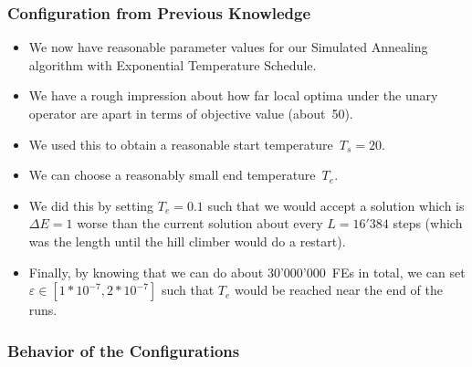 \documentclass[mathserif]{beamer}%
\begin{document}
%
\setcounter{eqLast}{\value{equation}}%
%
\begin{frame}%
\frametitle{Configuration from Previous Knowledge}%
\begin{itemize}%
\item We now have reasonable parameter values for our Simulated Annealing algorithm with Exponential Temperature Schedule.%
\item<2-> We have a rough impression about how far local optima under the unary operator are apart in terms of objective value (about~50).%
\item<3-> We used this to obtain a reasonable start \mbox{temperature $T_s=20$.}%
\item<4-> We can choose a reasonably small end temperature~$T_e$.
\item<5-> We did this by setting $T_e=0.1$ such that we would accept a solution which is $\Delta E=1$ worse than the current solution about every $L=16'384$ steps (which was the length until the hill climber would do a restart).%
\item<6-> Finally, by knowing that we can do about 30'000'000~FEs in total, we can set $\varepsilon\in\left[1 * 10^{-7}, 2*10^{-7}\right]$ such that $T_e$ would be reached near the end of the runs.%
\end{itemize}%
\end{frame}%
%
\begin{frame}[b]%
\frametitle{Behavior of the Configurations}%
%
%
%
%
%
%
%
\end{frame}%
%
\end{document}
